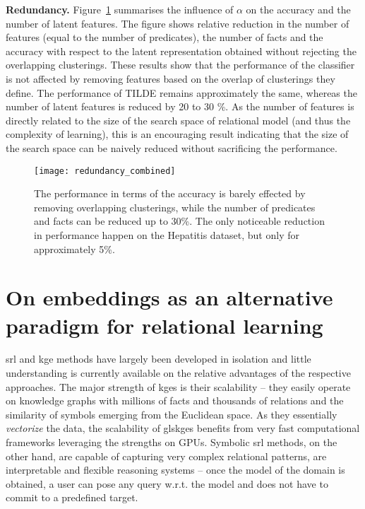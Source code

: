 \textbf{Redundancy.}
Figure~\ref{fig:Redundancy} summarises the influence of $\alpha$ on the accuracy and the number of latent features.
The figure shows relative reduction in the number of features (equal to the number of predicates), the number of facts and the accuracy with  respect to the latent representation obtained without rejecting the overlapping clusterings.
These results show that the performance of the classifier is not affected by removing features based on the overlap of clusterings they define.
The performance of TILDE remains approximately the same, whereas the number of latent features is reduced by 20 to 30 \%.
As the number of features is directly related to the size of the search space of relational model (and thus the complexity of learning), this is an encouraging result indicating that the size of the search space can be naively reduced without sacrificing the performance.








\begin{figure}[t]
	\centering
	\medskip
    \texttt{[image: redundancy\_combined]}
    \caption[Redundancy in latent representations created by \gls{curled}]{The performance in terms of the accuracy is barely effected by removing overlapping clusterings, while the number of predicates and facts can be reduced up to 30\%. The only noticeable reduction in performance happen on the Hepatitis dataset, but only for approximately 5\%.   }
    \label{fig:Redundancy}
\end{figure}








\section{On embeddings as an alternative paradigm for relational learning}






\gls{srl} and \gls{kge} methods have largely been developed in isolation and little understanding is currently available on the relative advantages of the respective approaches.
The major strength of \gls{kge}s is their scalability -- they easily operate on knowledge graphs with millions of facts and thousands of relations and the similarity of symbols emerging from the Euclidean space.
As they essentially \textit{vectorize} the data, the scalability of gls{kge}s benefits from very fast computational frameworks leveraging the strengths on GPUs.
Symbolic \gls{srl} methods, on the other hand, are capable of capturing very complex relational patterns, are interpretable and flexible reasoning systems -- once the model of the domain is obtained, a user can pose any query w.r.t. the model and does not have to commit to a predefined target.



